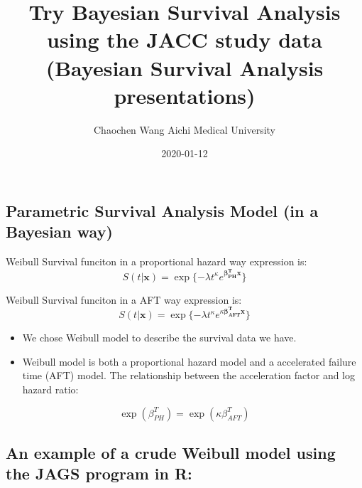 \documentclass[]{tufte-handout}
\title{Try Bayesian Survival Analysis using the JACC study data (Bayesian
Survival Analysis presentations)}
\author{Chaochen Wang \textbar{} Aichi Medical University}
\date{2020-01-12}
\begin{document}
\maketitle




\hypertarget{parametric-survival-analysis-model-in-a-bayesian-way}{%
\subsection{Parametric Survival Analysis Model (in a Bayesian
way)}\label{parametric-survival-analysis-model-in-a-bayesian-way}}

\begin{marginfigure}
Weibull Survival funciton in a proportional hazard way expression is:
\[S(t | \mathbf{x}) = \exp\{ -\lambda t ^\kappa e^{\mathbf{\beta_{PH}^T x}} \}\]
\end{marginfigure}

\begin{marginfigure}
Weibull Survival funciton in a AFT way expression is:
\[S(t | \mathbf{x}) = \exp\{ -\lambda t ^\kappa e^{\kappa\mathbf{\beta_{AFT}^T x}} \}\]
\end{marginfigure}

\begin{itemize}
\item
  We chose Weibull model to describe the survival data we have.
\item
  Weibull model is both a proportional hazard model and a accelerated
  failure time (AFT) model. The relationship between the acceleration
  factor and log hazard ratio:
\end{itemize}

\[
\exp(\beta^T_{PH}) = \exp(\kappa\beta^T_{AFT})
\]

\hypertarget{an-example-of-a-crude-weibull-model-using-the-jags-program-in-r}{%
\subsection{An example of a crude Weibull model using the JAGS program
in
R:}\label{an-example-of-a-crude-weibull-model-using-the-jags-program-in-r}}
\end{document}
